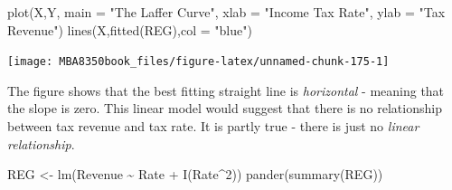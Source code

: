 \documentclass[
]{book}
\newenvironment{Shaded}{\begin{snugshade}}{\end{snugshade}}
\newcommand{\AttributeTok}[1]{\textcolor[rgb]{0.77,0.63,0.00}{#1}}
\newcommand{\DecValTok}[1]{\textcolor[rgb]{0.00,0.00,0.81}{#1}}
\newcommand{\FunctionTok}[1]{\textcolor[rgb]{0.00,0.00,0.00}{#1}}
\newcommand{\NormalTok}[1]{#1}
\newcommand{\OtherTok}[1]{\textcolor[rgb]{0.56,0.35,0.01}{#1}}
\newcommand{\SpecialCharTok}[1]{\textcolor[rgb]{0.00,0.00,0.00}{#1}}
\newcommand{\StringTok}[1]{\textcolor[rgb]{0.31,0.60,0.02}{#1}}
\begin{document}
\begin{Shaded}
\begin{Highlighting}[]
\FunctionTok{plot}\NormalTok{(X,Y,}
     \AttributeTok{main =} \StringTok{"The Laffer Curve"}\NormalTok{,}
     \AttributeTok{xlab =} \StringTok{"Income Tax Rate"}\NormalTok{,}
     \AttributeTok{ylab =} \StringTok{"Tax Revenue"}\NormalTok{)}
\FunctionTok{lines}\NormalTok{(X,}\FunctionTok{fitted}\NormalTok{(REG),}\AttributeTok{col =} \StringTok{"blue"}\NormalTok{)}
\end{Highlighting}
\end{Shaded}

\begin{center}\texttt{[image: MBA8350book\_files/figure-latex/unnamed-chunk-175-1]} \end{center}

The figure shows that the best fitting straight line is \emph{horizontal} - meaning that the slope is zero. This linear model would suggest that there is no relationship between tax revenue and tax rate. It is partly true - there is just no \emph{linear relationship}.

\begin{Shaded}
\begin{Highlighting}[]
\NormalTok{REG }\OtherTok{\textless{}{-}} \FunctionTok{lm}\NormalTok{(Revenue }\SpecialCharTok{\textasciitilde{}}\NormalTok{ Rate }\SpecialCharTok{+} \FunctionTok{I}\NormalTok{(Rate}\SpecialCharTok{\^{}}\DecValTok{2}\NormalTok{))}
\FunctionTok{pander}\NormalTok{(}\FunctionTok{summary}\NormalTok{(REG))}
\end{Highlighting}
\end{Shaded}
\end{document}
